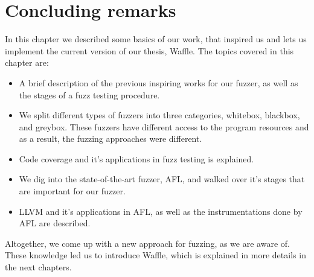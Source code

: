 \section{Concluding remarks}

In this chapter we described some basics of our work, that inspired us and lets us implement the current version of our thesis, Waffle. The topics covered in this chapter are:

\begin{itemize}
    \item A brief description of the previous inspiring works for our fuzzer, as well as the stages of a fuzz testing procedure.
    \item We split different types of fuzzers into three categories, whitebox, blackbox, and greybox. These fuzzers have different access to the program resources and as a result, the fuzzing approaches were different.
    \item Code coverage and it's applications in fuzz testing is explained.
    \item We dig into the state-of-the-art fuzzer, AFL, and walked over it's stages that are important for our fuzzer.
    \item LLVM and it's applications in AFL, as well as the instrumentations done by AFL are described.
\end{itemize}

Altogether, we come up with a new approach for fuzzing, as we are aware of. These knowledge led us to introduce Waffle, which is explained in more details in the next chapters.
